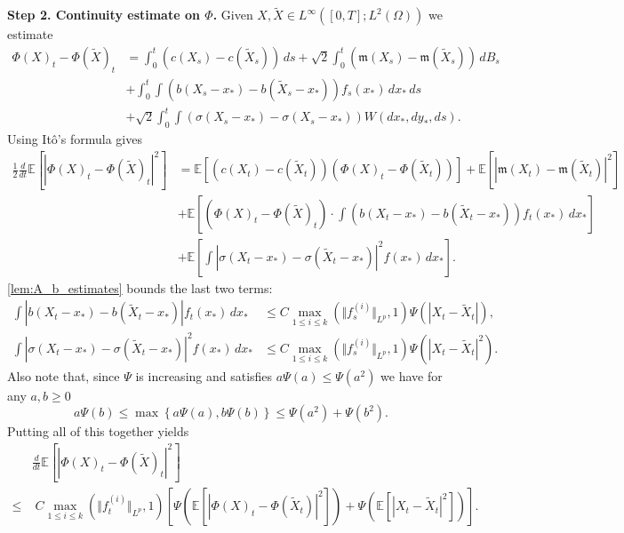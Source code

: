 \documentclass[10pt,oneside]{amsart}
\numberwithin{equation}{section}
\numberwithin{definition}{section}
\numberwithin{theorem}{section}
\numberwithin{lemma}{section}
\begin{document}
\textbf{Step 2. Continuity estimate on $\Phi$.} Given $X,\tilde{X}\in L^{\infty}\left([0,T];L^{2}(\Omega)\right)$ we estimate
%
\begin{align*}
  \Phi(X)_{t}-\Phi(\tilde{X})_{t} &
  =\int_{0}^{t}\left(c(X_{s})-c(\tilde{X}_{s})\right)\,ds+
  \sqrt{2}\int_{0}^{t}\left(\mathfrak m(X_{s})-\mathfrak m(\tilde{X}_{s})\right)\,dB_s	\\
  & +\int_{0}^{t}\int\left(b(X_{s}-x_{*})-b(\tilde{X}_{s}-x_{*})\right)f_{s}(x_{*})\,dx_{*}\,ds\\
  & +\sqrt{2}\int_{0}^{t}\int\left(\sigma(X_{s}-x_{*})-\sigma(X_{s}-x_{*})\right)W(dx_{*},dy_{*},ds).
\end{align*}
%
Using Itô's formula gives
%
\begin{align*}
  \frac{1}{2}\frac{d}{dt}\mathbb{E}\left[|\Phi(X)_{t}-\Phi(\tilde{X})_{t}|^{2}\right] &
  =\mathbb{E}\left[\left(c(X_{t})-c(\tilde{X}_{t})\right)\left(\Phi(X)_{t}-\Phi(\tilde{X}_{t})\right)\right]
  +\mathbb{E}\left[|\mathfrak m(X_{t})-\mathfrak m(\tilde{X}_{t})|^{2}\right]	\\
  & +\mathbb{E}\left[\left(\Phi(X)_{t}-\Phi(\tilde{X})_{t}\right)\cdot\int\left(b(X_{t}-x_{*})-b(\tilde{X}_{t}-x_{*})\right)f_{t}(x_{*})\,dx_{*}\right]\\
  & +\mathbb{E}\left[\int|\sigma(X_{t}-x_{*})-\sigma(\tilde{X}_{t}-x_{*})|^{2}f(x_{*})\,dx_{*}\right].
\end{align*}
%
\cref{lem:A_b_estimates} bounds the last two terms:
%
\begin{align*}
  \int|b(X_{t}-x_{*})-b(\tilde{X}_{t}-x_{*})|f_{t}(x_{*})\,dx_{*}
  &\leq C\max_{1\leq i\leq k}(\Vert f_{s}^{(i)}\Vert_{L^p},1)\Psi\left(|X_{t}-\tilde{X}_{t}|\right),\\
  \int|\sigma(X_{t}-x_{*})-\sigma(\tilde{X}_{t}-x_{*})|^{2}f(x_{*})\, dx_*
  &\leq C\max_{1\leq i\leq k}(\Vert f_{s}^{(i)}\Vert_{L^p},1)\Psi\left(|X_{t}-\tilde{X}_{t}|^{2}\right).
\end{align*}
%
Also note that, since  $\Psi$  is increasing and satisfies $a\Psi(a)\leq\Psi(a^{2})$ we have for any $a,b\geq0$
%
\begin{equation*}
  a\Psi(b)\leq\max\left\{ a\Psi(a),b\Psi(b)\right\} \leq\Psi(a^{2})+\Psi(b^{2}).
\end{equation*}
%
Putting all of this together yields
%
\begin{align}\label{eq:diff_ineq_phi}
  & \frac{d}{dt}\mathbb{E}\left[|\Phi(X)_{t}-\Phi(\tilde{X})_{t}|^{2}\right]	\\
  \leq & \; C\max_{1\leq i\leq k}(\Vert f_{t}^{(i)}\Vert_{L^p},1)
  \left[\Psi\left(\mathbb{E}\left[|\Phi(X)_{t}-\Phi(\tilde{X}_{t})|^{2}\right]\right)
  +\Psi\left(\mathbb{E}\left[|X_{t}-\tilde{X}_{t}|^{2}\right]\right)\right].\nonumber
\end{align}
\end{document}
